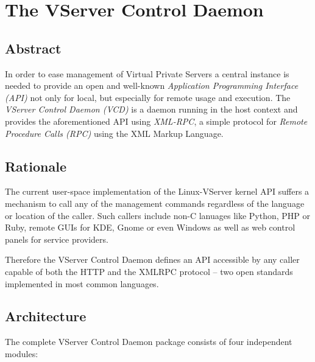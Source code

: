 \chapter{The VServer Control Daemon}
\label{ch:intro:vcd}


\section{Abstract}
\label{sec:intro:vcd:abstract}

In order to ease management of Virtual Private Servers a central instance is
needed to provide an open and well-known \emph{Application Programming
Interface (API)} not only for local, but especially for remote usage and
execution.  The \emph{VServer Control Daemon (VCD)} is a daemon running
in the host context and provides the aforementioned API using \emph{XML-RPC}, a
simple protocol for \emph{Remote Procedure Calls (RPC)} using the XML Markup
Language.


\section{Rationale}
\label{sec:intro:vcd:rationale}

The current user-space implementation of the Linux-VServer kernel API suffers a
mechanism to call any of the management commands regardless of the language or
location of the caller. Such callers include non-C lanuages like Python, PHP or
Ruby, remote GUIs for KDE, Gnome or even Windows as well as web control panels
for service providers.

Therefore the VServer Control Daemon defines an API accessible by any caller
capable of both the HTTP and the XMLRPC protocol -- two open standards
implemented in most common languages.


\section{Architecture}
\label{sec:intro:vcd:architecture}

The complete VServer Control Daemon package consists of four independent
modules:

